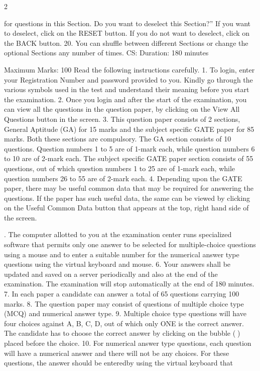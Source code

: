 \documentclass[a4paper,10pt,twoside]{article}
\begin{document}
\begin{multicols}{2}
{for questions in this Section. Do you want to deselect this Section?'' If you want to
deselect, click on the RESET button. If you do not want to deselect, click on the BACK
button.
20. You can shuffle between different Sections or change the optional Sections any
number of times.
CS:
Duration: 180 minutes
\par\smallskip
Maximum Marks: 100
Read the following instructions carefully.
1. To login, enter your Registration Number and password provided to you. Kindly go through the various
symbols used in the test and understand their meaning before you start the examination.
2. Once you login and after the start of the examination, you can view all the questions in the question
paper, by clicking on the View All Questions button in the screen.
3. This question paper consists of 2 sections, General Aptitude (GA) for 15 marks and the subject
specific GATE paper for 85 marks. Both these sections are compulsory.
The GA section consists of 10 questions. Question numbers 1 to 5 are of 1-mark each, while question
numbers 6 to 10 are of 2-mark each.
The subject specific GATE paper section consists of 55 questions, out of which question numbers 1 to
25 are of 1-mark each, while question numbers 26 to 55 are of 2-mark each.
4. Depending upon the GATE paper, there may be useful common data that may be required for
answering the questions. If the paper has such useful data, the same can be viewed by clicking on the
Useful Common Data button that appears at the top, right hand side of the screen.
\par{}. The computer allotted to you at the examination center runs specialized software that permits only one
answer to be selected for multiple-choice questions using a mouse and to enter a suitable number for
the numerical answer type questions using the virtual keyboard and mouse.
6. Your answers shall be updated and saved on a server periodically and also at the end of the
examination. The examination will stop automatically at the end of 180 minutes.
7. In each paper a candidate can answer a total of 65 questions carrying 100 marks.
8. The question paper may consist of questions of multiple choice type (MCQ) and numerical answer
type.
9. Multiple choice type questions will have four choices against A, B, C, D, out of which only ONE is the
correct answer. The candidate has to choose the correct answer by clicking on the bubble (⃝) placed
before the choice.
10. For numerical answer type questions, each question will have a numerical answer and there will not be
any choices. For these questions, the answer should be enteredby using the virtual keyboard that
}
\end{multicols}
\end{document}
